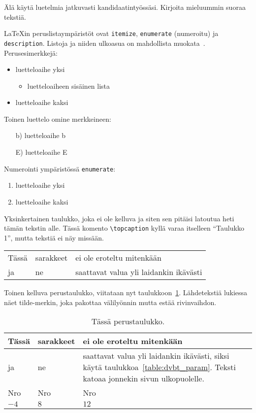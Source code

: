 Älä käytä luetelmia jatkuvasti kandidaatintyössäsi. Kirjoita
mieluummin suoraa tekstiä.

\LaTeX{}in peruslistaympäristöt ovat \verb!itemize!, 
\verb!enumerate! (numeroitu)
ja \verb!description!. Listoja ja niiden ulkoasua on
mahdollista muokata~\citep[katso esim.][s. 128]{mittelbach2004}. 
Perusesimerkkejä:
%
\begin{itemize}
\item luetteloaihe yksi
 \begin{itemize}
 \item luetteloaiheen sisäinen lista
 \end{itemize}
\item luetteloaihe kaksi
\end{itemize}

Toinen luettelo omine merkkeineen:
%
\begin{itemize}
\item[b)] luetteloaihe b
\item[E)] luetteloaihe E
\end{itemize}

Numerointi ympäristössä \verb!enumerate!:
%
\begin{enumerate}
\item luetteloaihe yksi
\item luetteloaihe kaksi
\end{enumerate}


Yksinkertainen taulukko, joka ei ole kelluva ja siten sen pitäisi
latoutua heti tämän tekstin alle. Tässä komento \verb!\topcaption!
kyllä varaa itselleen ``Taulukko 1'', mutta tekstiä ei näy missään.

\begin{tabular}{|l|l|l|} 
\hline
Tässä & sarakkeet & ei ole eroteltu mitenkään \\
ja    & ne        & saattavat valua yli laidankin ikävästi \\
\hline
\end{tabular}

Toinen kelluva perustaulukko, viitataan nyt taulukkoon~\ref{table:perustaulu}.
Lähdetekstiä lukiessa näet tilde-merkin, joka pakottaa välilyönnin
mutta estää rivinvaihdon.

\begin{table}[ht]
\caption{Tässä perustaulukko.}
\label{table:perustaulu}
\begin{center}
\begin{tabular}{|l|l|l|} 
\hline
Tässä & sarakkeet & ei ole eroteltu mitenkään \\
\hline
ja    & ne        & saattavat valua yli laidankin ikävästi, %
                   siksi käytä taulukkoa~\ref{table:dvbt_param}. %
                   Teksti katoaa jonnekin sivun ulkopuolelle. \\
\hline
Nro   & Nro       & Nro \\
\hline
$-4$  & $8$       & $12$ \\
\hline
\end{tabular}
\end{center}
\end{table}

